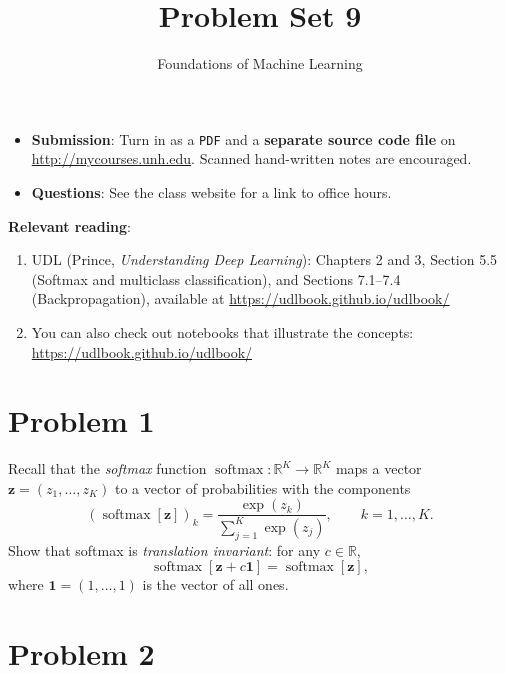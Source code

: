 \documentclass[letterpaper]{article}
\title{Problem Set 9}
\author{Foundations of Machine Learning}
\date{}
\newcommand{\Real}{\mathbb{R}}
\DeclareMathOperator{\softmax}{softmax}
\begin{document}
\maketitle

\begin{itemize}
\item \textbf{Submission}: Turn in as a \texttt{PDF} and a \textbf{separate source code file} on \url{http://mycourses.unh.edu}. Scanned hand-written notes are encouraged.
\item \textbf{Questions}: See the class website for a link to office hours.
\end{itemize}

\textbf{Relevant reading}:
\begin{enumerate}
\item UDL (Prince, \emph{Understanding Deep Learning}): Chapters 2 and 3, Section 5.5 (Softmax and multiclass classification), and Sections 7.1--7.4 (Backpropagation), available at \url{https://udlbook.github.io/udlbook/}
\item You can also check out notebooks that illustrate the concepts: \url{https://udlbook.github.io/udlbook/}
\end{enumerate}


\section*{Problem 1}

Recall that the \emph{softmax} function $\softmax\colon \Real^K \to \Real^K$ maps a vector $\bm{z} = (z_1, \ldots, z_K)$ to a vector of probabilities with the components
\[
  (\softmax[\bm{z}])_k = \frac{\exp(z_k)}{\sum_{j=1}^K \exp(z_j)}, \qquad k = 1, \ldots, K.
\]
Show that softmax is \emph{translation invariant}: for any $c \in \Real$,
\[
  \softmax[\bm{z} + c \bm{1}] = \softmax[\bm{z}],
\]
where $\bm{1} = (1, \ldots, 1)$ is the vector of all ones.

\section*{Problem 2}
\end{document}
